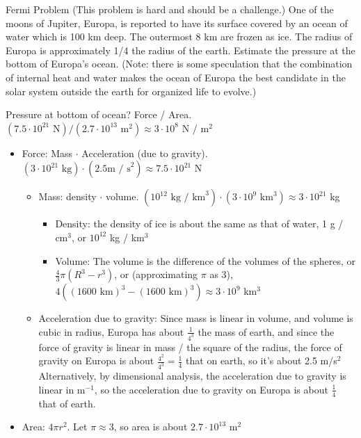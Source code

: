 \documentclass{esg8012pset}
\date{September 8}
\begin{document}
\begin{problem}{Fermi Problem (This problem is hard and should be a challenge.)}
  One of the moons of Jupiter, Europa, is reported to have its surface covered by an ocean of water 
  which is 100 km deep.  The outermost 8 km are frozen as ice. The radius of Europa is
  approximately 1/4 the radius of the earth. Estimate the pressure at the bottom of Europa's ocean.
  (Note: there is some speculation that the combination of internal heat and water makes the ocean
  of Europa the best candidate in the solar system outside the earth for organized life to evolve.)
\end{problem}%
\begin{solution}
  Pressure at bottom of ocean?  Force / Area.  $(7.5\cdot 10^{21}\text{ N}) / (2.7 \cdot 10^{13}\text{ m}^2) \approx 3 \cdot 10^8$ N / m$^2$
  \begin{itemize}
    \item Force: Mass $\cdot$ Acceleration (due to gravity). $(3 \cdot 10^{21}\text{ kg}) \cdot (2.5\text{m / s}^2) \approx 7.5\cdot 10^{21}$ N
      \begin{itemize}
        \item Mass: density $\cdot$ volume.  $(10^{12}\text{ kg / km}^3) \cdot (3 \cdot 10^9\text{ km}^3) \approx 3 \cdot 10^{21}$ kg
          \begin{itemize}
            \item Density: the density of ice is about the same as that of water, 1 g / cm$^3$, or $10^{12}$ kg / km$^3$
            \item Volume: The volume is the difference of the volumes of the spheres, or $\frac{4}{3}\pi (R^3 - r^3)$, or (approximating $\pi$ as 3), $4((1600\text{ km})^3 - (1600\text{ km})^3) \approx 3 \cdot 10^9$ km$^3$
          \end{itemize}
        \item Acceleration due to gravity: Since mass is linear in volume, and volume is cubic in radius, Europa has about $\frac{1}{4^3}$ the mass of earth, and since the force of gravity is linear in mass / the square of the radius, the force of gravity on Europa is about $\frac{4^2}{4^3} = \frac{1}{4}$ that on earth, so it's about 2.5 m/s$^2$  Alternatively, by dimensional analysis, the acceleration due to gravity is linear in m$^{-1}$, so the acceleration due to gravity on Europa is about $\frac{1}{4}$ that of earth.
      \end{itemize}
    \item Area: $4\pi r^2$.  Let $\pi \approx 3$, so area is about $2.7 \cdot 10^{13}$ m$^2$

\end{itemize}
\end{solution}
\end{document}
